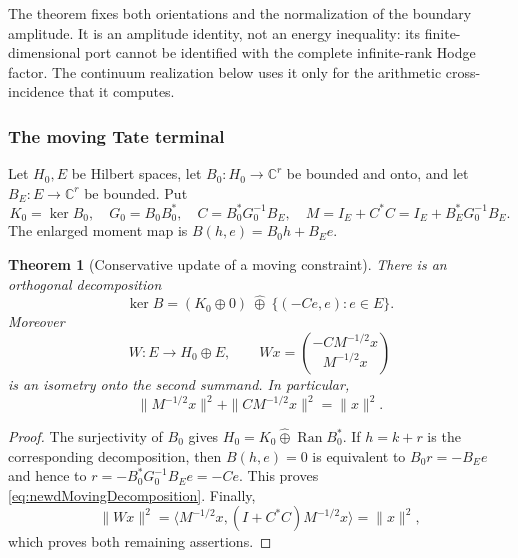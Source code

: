 \documentclass[11pt]{amsart}
\newtheorem{theorem}{Theorem}[section]
\theoremstyle{definition}
\theoremstyle{remark}
\newcommand{\C}{\mathbb C}
\begin{document}
The theorem fixes both orientations and the normalization of the boundary
amplitude.  It is an amplitude identity, not an energy inequality: its
finite-dimensional port cannot be identified with the complete
infinite-rank Hodge factor.  The continuum realization below uses it only
for the arithmetic cross-incidence that it computes.

\subsubsection{The moving Tate terminal}

Let $H_0,E$ be Hilbert spaces, let $B_0:H_0\to\C^r$ be bounded and onto,
and let $B_E:E\to\C^r$ be bounded.  Put
\begin{equation}\label{eq:newdMovingData}
 K_0=\ker B_0,
 \quad G_0=B_0B_0^*,
 \quad C=B_0^*G_0^{-1}B_E,
 \quad M=I_E+C^*C=I_E+B_E^*G_0^{-1}B_E.
\end{equation}
The enlarged moment map is $B(h,e)=B_0h+B_Ee$.

\begin{theorem}[Conservative update of a moving constraint]
\label{thm:newdMovingConstraint}
There is an orthogonal decomposition
\begin{equation}\label{eq:newdMovingDecomposition}
 \ker B=(K_0\oplus0)\ \widehat\oplus\
          \{(-Ce,e):e\in E\}.
\end{equation}
Moreover
\begin{equation}\label{eq:newdMovingIsometry}
 W:E\longrightarrow H_0\oplus E,
 \qquad
 Wx=\binom{-CM^{-1/2}x}{M^{-1/2}x}
\end{equation}
is an isometry onto the second summand.  In particular,
\begin{equation}\label{eq:newdMovingConservation}
 \|M^{-1/2}x\|^2+\|CM^{-1/2}x\|^2=\|x\|^2.
\end{equation}
\end{theorem}

\begin{proof}
The surjectivity of $B_0$ gives
$H_0=K_0\widehat\oplus\operatorname{Ran} B_0^*$.  If $h=k+r$ is the corresponding
decomposition, then $B(h,e)=0$ is equivalent to $B_0r=-B_Ee$ and hence to
$r=-B_0^*G_0^{-1}B_Ee=-Ce$.  This proves
\eqref{eq:newdMovingDecomposition}.  Finally,
\[
 \|Wx\|^2
 =\langle M^{-1/2}x,(I+C^*C)M^{-1/2}x\rangle=\|x\|^2,
\]
which proves both remaining assertions.
\end{proof}
\end{document}
